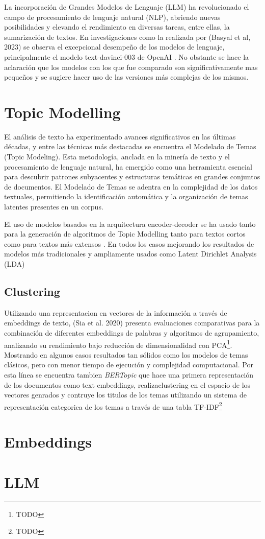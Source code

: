 La incorporación de Grandes  Modelos de Lenguaje (LLM) ha revolucionado el campo de procesamiento de lenguaje natural (NLP), abriendo nuevas posibilidades y elevando el rendimiento en diversas tareas, entre ellas, la sumarización de textos. En investigaciones como la realizada por (Basyal et al, 2023) \cite{basyal2023text} se observa el excepcional desempeño de los modelos de lenguaje, principalmente el modelo text-davinci-003 de OpenAI \cite{openai}. No obstante se hace la aclaraci\'on que los modelos con los que fue comparado son significativamente mas peque\~nos y se sugiere hacer uso de las versiones m\'as complejas de los mismos.

\section{Topic Modelling}

    El análisis de texto ha experimentado avances significativos en las últimas décadas, y entre las técnicas más destacadas se encuentra el Modelado de Temas (Topic Modeling). Esta metodología, anclada en la minería de texto y el procesamiento de lenguaje natural, ha emergido como una herramienta esencial para descubrir patrones subyacentes y estructuras temáticas en grandes conjuntos de documentos. El Modelado de Temas se adentra en la complejidad de los datos textuales, permitiendo la identificación automática y la organización de temas latentes presentes en un corpus\cite{lda2003}.

    El uso de modelos basados en la arquitectura encoder-decoder se ha usado tanto para la generaci\'on de algoritmos de Topic Modelling tanto para textos cortos \cite{neuraltm} como para textos m\'as extensos \cite{tm-in-emb}. En todos los casos mejorando los resultados de modelos m\'as tradicionales y ampliamente usados como Latent Dirichlet Analysis (LDA)\cite{lda2003}

    \subsection{Clustering}
    Utilizando una representacion en vectores de la informaci\'on a trav\'es de embeddings de texto,  (Sia et al. 2020) \cite{sia2020tired} presenta evaluaciones comparativas para la combinación de diferentes embeddings de palabras y algoritmos de agrupamiento, analizando su rendimiento bajo reducción de dimensionalidad con PCA\footnote{TODO}. Mostrando en algunos casos resultados tan sólidos como los modelos de temas clásicos, pero con menor tiempo de ejecución y complejidad computacional. 
    Por esta l\'inea se encuentra tambien \emph{BERTopic}\cite{bertopic} que hace una primera representaci\'on de los documentos como text embeddings, realizaclustering en el espacio de los vectores genrados y contruye los titulos de los temas utilizando un sistema de representaci\'on categorica de los temas a trav\'es de una tabla TF-IDF\footnote{TODO}

\section{Embeddings}

\section{LLM}
